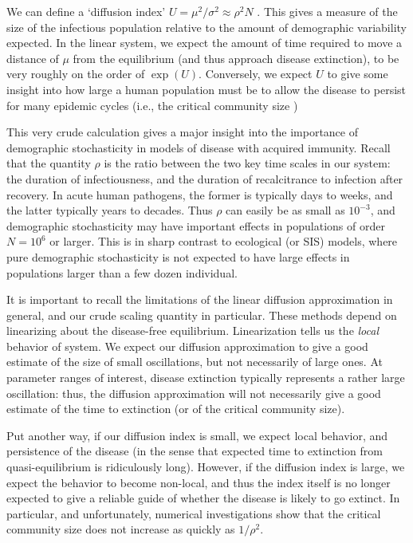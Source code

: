 \documentclass{amsproc}
\theoremstyle{definition}
\theoremstyle{remark}
\numberwithin{equation}{section}
\begin{document}
We can define a `diffusion index' $U = \mu^2/\sigma^2 \approx \rho^2 N$ .  This gives a measure of the size of the infectious population relative to the amount of demographic variability expected.  In the linear system, we expect the amount of time required to move a distance of $\mu$ from the equilibrium (and thus approach disease extinction), to be very roughly on the order of $\exp(U)$.  Conversely, we expect $U$ to give some insight into how large a human population must be to allow the disease to persist for many epidemic cycles (i.e., the critical community size ) 

This very crude calculation gives a major insight into the importance of demographic stochasticity in models of disease with acquired immunity.  Recall that the quantity $\rho$ is the ratio between the two key time scales in our system: the duration of infectiousness, and the duration of recalcitrance to infection after recovery.  In acute human pathogens, the former is typically days to weeks, and the latter typically years to decades.  Thus $\rho$ can easily be as small as $10^{-3}$, and demographic stochasticity may have important effects in populations of order $N=10^6$ or larger.  This is in sharp contrast to ecological (or SIS) models, where pure demographic stochasticity is not expected to have large effects in populations larger than a few dozen individual.

It is important to recall the limitations of the linear diffusion approximation in general, and our crude scaling quantity in particular. These methods depend on linearizing about the disease-free equilibrium.  Linearization tells us the {\em local} behavior of system.   We expect our diffusion approximation to give a good estimate of the size of small oscillations, but not necessarily of large ones.  At parameter ranges of interest, disease extinction typically represents a rather large oscillation: thus, the diffusion approximation will not necessarily give a good estimate of the time to extinction (or of the critical community size).

Put another way, if our diffusion index is small, we expect local behavior, and persistence of the disease (in the sense that expected time to extinction from quasi-equilibrium is ridiculously long).  
However, if the diffusion index is large, we expect the behavior to become non-local, and thus the index itself is no longer expected to give a reliable guide of whether the disease is likely to go extinct.
In particular, and unfortunately, numerical investigations show that the critical community size does not increase as quickly as $1/\rho^2$.
\end{document}
